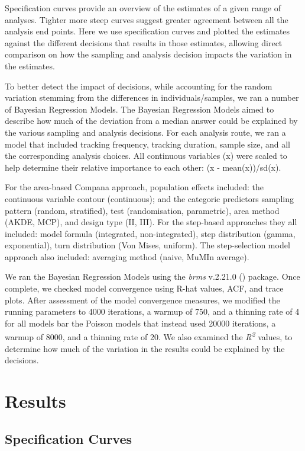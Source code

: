 \documentclass[10pt,a4paper]{article}
\begin{document}
Specification curves provide an overview of the estimates of a given range of analyses.
Tighter more steep curves suggest greater agreement between all the analysis end points.
Here we use specification curves and plotted the estimates against the different decisions that results in those estimates, allowing direct comparison on how the sampling and analysis decision impacts the variation in the estimates.

To better detect the impact of decisions, while accounting for the random variation stemming from the differences in individuals/samples, we ran a number of Bayesian Regression Models.
The Bayesian Regression Models aimed to describe how much of the deviation from a median answer could be explained by the various sampling and analysis decisions.
For each analysis route, we ran a model that included tracking frequency, tracking duration, sample size, and all the corresponding analysis choices.
All continuous variables (x) were scaled to help determine their relative importance to each other: (x - mean(x))/sd(x).

For the area-based Compana approach, population effects included: the continuous variable contour (continuous); and the categoric predictors sampling pattern (random, stratified), test (randomisation, parametric), area method (AKDE, MCP), and design type (II, III).
For the step-based approaches they all included: model formula (integrated, non-integrated), step distribution (gamma, exponential), turn distribution (Von Mises, uniform).
The step-selection model approach also included: averaging method (naive, MuMIn average).

We ran the Bayesian Regression Models using the \emph{brms} v.2.21.0 () package.
Once complete, we checked model convergence using R-hat values, ACF, and trace plots.
After assessment of the model convergence measures, we modified the running parameters to 4000 iterations, a warmup of 750, and a thinning rate of 4 for all models bar the Poisson models that instead used 20000 iterations, a warmup of 8000, and a thinning rate of 20.
We also examined the \emph{R\textsuperscript{2}} values, to determine how much of the variation in the results could be explained by the decisions.

\section{Results}\label{results}

\subsection{Specification Curves}\label{specification-curves}
\end{document}
